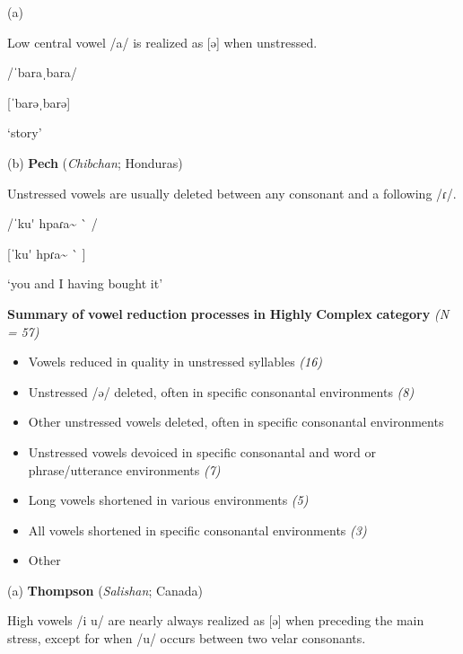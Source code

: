 (a)

Low central vowel /a/ is realized as [ə] when unstressed.

/ˈbaraˌbara/

[ˈbarəˌbarə]

\glt ‘story’

\citep[17-18]{Rumsey1978}

(b)  \textbf{Pech} (\textit{Chibchan}; Honduras)

Unstressed vowels are usually deleted between any consonant and a following /ɾ/.

/ˈku\'{} hpaɾa\~{} \`{} /

[ˈku\'{} hpɾa\~{} \`{} ]

\glt ‘you and I having bought it’

\citep[23]{Holt1999}

\z

\ea\label{ex:(6.19)}
  \textbf{Summary} \textbf{of} \textbf{vowel} \textbf{reduction} \textbf{processes} \textbf{in} \textbf{Highly} \textbf{Complex} \textbf{category} \textit{(N} \textit{=} \textit{57)}

\begin{itemize}
\item 
Vowels reduced in quality in unstressed syllables \textit{(16)}

\item 
Unstressed /ə/ deleted, often in specific consonantal environments \textit{(8)}

\item 
Other unstressed vowels deleted, often in specific consonantal environments \textit{}

\item 
Unstressed vowels devoiced in specific consonantal and word or phrase/utterance environments \textit{(7)}

\item 
Long vowels shortened in various environments \textit{(5)}

\item 
All vowels shortened in specific consonantal environments \textit{(3)}

\item 
Other \textit{}

\end{itemize}

(a)  \textbf{Thompson} (\textit{Salishan}; Canada)

High vowels /i u/ are nearly always realized as [ə] when preceding the main stress, except for when /u/ occurs between two velar consonants. 

